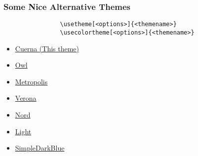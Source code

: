 \documentclass{beamer}
\begin{document}
\begin{frame}
\begin{columns}[T]
\begin{column}{0.5\textwidth}
\begin{figure}[htbp]
\begin{centering}
\begin{overlayarea}{\textwidth}{\textheight}
                            \end{overlayarea}
                        \end{centering}
                    \end{figure}
                \end{column}
            \end{columns}
        \end{frame}
        \begin{frame}[containsverbatim]
            \frametitle{Some Nice Alternative Themes}
            \begin{verbatim}
                \usetheme[<options>]{<themename>}
                \usecolortheme[<options>]{<themename>}
            \end{verbatim}
            \begin{itemize}
                \item \href{https://ctan.org/pkg/beamertheme-cuerna}{Cuerna (This theme)}
                \item \href{https://ctan.org/pkg/beamercolorthemeowl}{Owl}
                \item \href{https://ctan.org/pkg/beamertheme-metropolis}{Metropolis}
                \item \href{https://ctan.org/pkg/beamer-verona}{Verona}
                \item \href{https://ctan.org/pkg/beamerthemenord}{Nord}
                \item \href{https://ctan.org/pkg/beamertheme-light}{Light}
                \item \href{https://ctan.org/pkg/beamertheme-simpledarkblue}{SimpleDarkBlue}
            \end{itemize}
        \end{frame}
\end{document}
